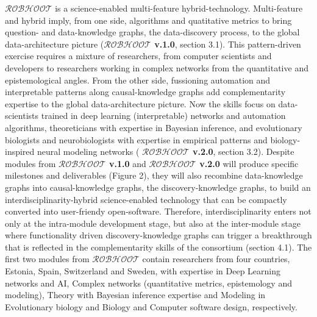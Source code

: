 \documentclass[11pt, a4paper]{article} %
\begin{document}
  {\bf $\mathcal{ROBHOOT}$} is a science-enabled multi-feature
  hybrid-technology. Multi-feature and hybrid imply, from one side,
  algorithms and quatitative metrics to bring question- and
  data-knowledge graphs, the data-discovery process, to the global
  data-architecture picture ({\bf $\mathcal{ROBHOOT}$ v.1.0}, section
  3.1). This pattern-driven exercise requires a mixture of
  researchers, from computer scientists and developers to researchers
  working in complex networks from the quantitative and
  epistemological angles. From the other side, fussioning automation
  and interpretable patterns along causal-knowledge graphs add
  complementarity expertise to the global data-architecture
  picture. Now the skills focus on data-scientists trained in deep
  learning (interpretable) networks and automation algorithms,
  theoreticians with expertise in Bayesian inference, and evolutionary
  biologists and neurobiologists with expertise in empirical patterns
  and biology-inspired neural modeling networks ({\bf
    $\mathcal{ROBHOOT}$ v.2.0}, section 3.2). Despite modules from
  {\bf $\mathcal{ROBHOOT}$ v.1.0} and {\bf $\mathcal{ROBHOOT}$ v.2.0}
  will produce specific milestones and deliverables (Figure 2), they
  will also recombine data-knowledge graphs into causal-knowledge
  graphs, the discovery-knowledge graphs, to build an
  interdisciplinarity-hybrid science-enabled technology that can be
  compactly converted into user-friendy open-software. Therefore,
  interdisciplinarity enters not only at the intra-module development
  stage, but also at the inter-module stage where functionality driven
  discovery-knowledge graphs can trigger a breakthrough that is
  reflected in the complementarity skills of the consortium (section
  4.1). The first two modules from {\bf $\mathcal{ROBHOOT}$} contain
  researchers from four countries, Estonia, Spain, Switzerland and
  Sweden, with expertise in Deep Learning networks and AI, Complex
  networks (quantitative metrics, epistemology and modeling), Theory
  with Bayesian inference expertise and Modeling in Evolutionary
  biology and Biology and Computer software design, respectively.
\end{document}
